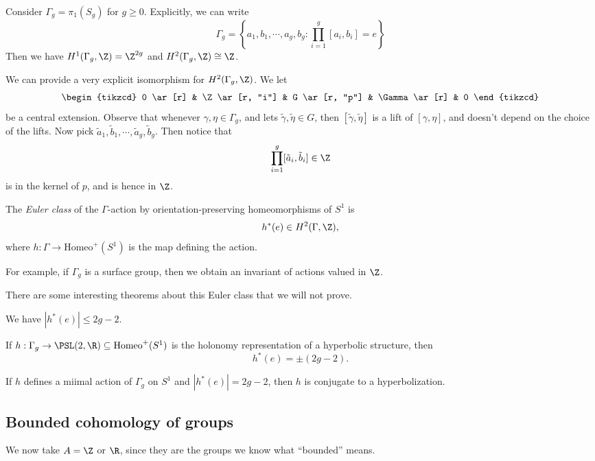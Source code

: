 \documentclass[a4paper]{article}
\newcommand\Homeo{\mathrm{Homeo}}
\begin{document}
\begin{eg}
  Consider $\Gamma_g = \pi_1(S_g)$ for $g \geq 0$. Explicitly, we can write
  \[
    \Gamma_g = \left\{a_1, b_1, \cdots, a_g, b_g : \prod_{i = 1}^g [a_i, b_i] = e\right\}
  \]
  Then we have $H^1(\Gamma_g, \Z) = \Z^{2g}$ and $H^2(\Gamma_g, \Z) \cong \Z$.

  We can provide a very explicit isomorphism for $H^2(\Gamma_g, \Z)$. We let
  \[
    \begin{tikzcd}
      0 \ar[r] & \Z \ar[r, "i"] & G \ar[r, "p"] & \Gamma \ar[r] & 0
    \end{tikzcd}
  \]
  be a central extension. Observe that whenever $\gamma, \eta \in \Gamma_g$, and lets $\tilde{\gamma}, \tilde{\eta} \in G$, then $[\tilde{\gamma}, \tilde{\eta}]$ is a lift of $[\gamma, \eta]$, and doesn't depend on the choice of the lifts. Now pick $\tilde{a}_1, \tilde{b}_1, \cdots, \tilde{a}_g, \tilde{b}_g$. Then notice that
  \[
    \prod_{i = 1}^g [\tilde{a}_i, \tilde{b}_i] \in \Z
  \]
  is in the kernel of $p$, and is hence in $\Z$.
\end{eg}

\begin{defi}
  The \emph{Euler class} of the $\Gamma$-action by orientation-preserving homeomorphisms of $S^1$ is
  \[
    h^*(e) \in H^2(\Gamma, \Z),
  \]
  where $h: \Gamma \to \Homeo^+(S^1)$ is the map defining the action.
\end{defi}

For example, if $\Gamma_g$ is a surface group, then we obtain an invariant of actions valued in $\Z$.

There are some interesting theorems about this Euler class that we will not prove.
\begin{thm}
  We have $|h^*(e)| \leq 2g - 2$.
\end{thm}

\begin{thm}
  If $h: \Gamma_g \to \PSL(2, \R) \subseteq \Homeo^+(S^1)$ is the holonomy representation of a hyperbolic structure, then
  \[
    h^*(e) = \pm (2g - 2).
  \]
\end{thm}

\begin{thm}[Matsumoko, 1986]
  If $h$ defines a miimal action of $\Gamma_g$ on $S^1$ and $|h^*(e)| = 2g - 2$, then $h$ is conjugate to a hyperbolization.
\end{thm}

\subsection{Bounded cohomology of groups}
We now take $A = \Z$ or $\R$, since they are the groups we know what ``bounded'' means.
\end{document}
